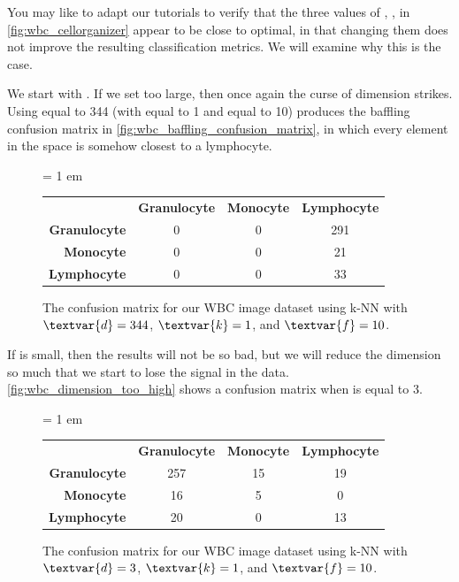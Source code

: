 You may like to adapt our tutorials to verify that the three values of , ,  in \autoref{fig:wbc_cellorganizer} appear to be close to optimal, in that changing them does not improve the resulting classification metrics. We will examine why this is the case.

We start with . If we set  too large, then once again the curse of dimension strikes. Using  equal to 344 (with  equal to 1 and  equal to 10) produces the baffling confusion matrix in \autoref{fig:wbc_baffling_confusion_matrix}, in which every element in the space is somehow closest to a lymphocyte.\\

\begin{figure}[h]
\centering
\tabcolsep = 1 em
\mySfFamily
\begin{tabular}{r c c c}
\rowcolor{gray!50}
& \textbf{Granulocyte} & \textbf{Monocyte} & \textbf{Lymphocyte} \\
\textbf{Granulocyte} & 0 & 0 & 291 \\
\textbf{Monocyte} & 0 & 0 & \phantom{5}21 \\
\textbf{Lymphocyte} & 0 & 0 & \phantom{5}33
\end{tabular}
\caption{The confusion matrix for our WBC image dataset using k-NN with $\textvar{d} = \text{344}$, $\textvar{k} = \text{1}$, and $\textvar{f} = \text{10}$.}
\label{fig:wbc_baffling_confusion_matrix}
\end{figure}

If  is small, then the results will not be so bad, but we will reduce the dimension so much that we start to lose the signal in the data.  \autoref{fig:wbc_dimension_too_high} shows a confusion matrix when  is equal to 3.

\begin{figure}[h]
\centering
\tabcolsep = 1 em
\mySfFamily
{}
\begin{tabular}{r c c c}
\rowcolor{gray!50}
& \textbf{Granulocyte} & \textbf{Monocyte} & \textbf{Lymphocyte} \\
\textbf{Granulocyte} & 257 & 15 & 19 \\
\textbf{Monocyte} & \phantom{5}16 & \phantom{5}5 & \phantom{5}0 \\
\textbf{Lymphocyte} & \phantom{5}20 & \phantom{5}0 & 13
\end{tabular}
\caption{The confusion matrix for our WBC image dataset using k-NN with $\textvar{d} = \text{3}$, $\textvar{k} = \text{1}$, and $\textvar{f} = \text{10}$.}
\label{fig:wbc_dimension_too_high}
\end{figure}

